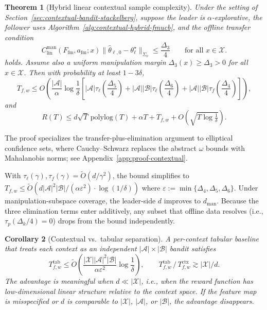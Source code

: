 \documentclass{article}
\newcommand{\cA}{\mathcal{A}}
\newcommand{\cX}{\mathcal{X}}
\newcommand{\cB}{\mathcal{B}}
\newtheorem{theorem}{Theorem}
\newtheorem{corollary}[theorem]{Corollary}
\begin{document}
\begin{theorem}[Hybrid linear contextual sample complexity]
\label{thm:hybrid-contextual-sample-complexity}
Under the setting of Section~\ref{sec:contextual-bandit-stackelberg}, suppose the leader is $\alpha$-explorative, the follower uses Algorithm~\ref{alg:contextual-hybrid-fmucb}, and the offline transfer condition
\[
    C^{\mathrm{man}}_{\mathrm{lin}}(F_{\mathrm{fm}},a_{\mathrm{fm}};x)\|\hat\theta_{\ell,0}-\theta_\ell^\star\|_{\Sigma_\nu}\le \frac{\Delta_3}{4}
    \qquad\text{for all }x\in\cX.
\]
holds. Assume also a uniform manipulation margin $\Delta_3(x)\ge \Delta_3>0$ for all $x\in\cX$. Then with probability at least $1-3\delta$, 
\[
    T_{f,w}\le
    O\!\left(\frac{|\cA|}{\alpha}\log\frac1\delta
    \left[|\cA|\tau_\ell\!\left(\frac{\Delta_5}{4}\right)+|\cA||\cB|\tau_\ell\!\left(\frac{\Delta_6}{4}\right)+|\cA||\cB|\tau_f\!\left(\frac{\Delta_4}{4}\right)\right]\right),
\]
and
\[
    R(T)\le d\sqrt{T}\,\mathrm{polylog}(T)+\alpha T+T_{f,w}+O\!\left(\sqrt{T\log\tfrac{1}{\delta}}\right).
\]
\end{theorem}

The proof specializes the transfer-plus-elimination argument to elliptical confidence sets, where Cauchy--Schwarz replaces the abstract $\omega$ bounds with Mahalanobis norms; see Appendix~\ref{app:proof-contextual}.

With $\tau_\ell(\gamma),\tau_f(\gamma)=\widetilde O(d/\gamma^2)$, the bound simplifies to $T_{f,w}\le \widetilde O(d|\cA|^2|\cB|/(\alpha\varepsilon^2)\cdot\log(1/\delta))$ where $\varepsilon:=\min\{\Delta_4,\Delta_5,\Delta_6\}$. Under manipulation-subspace coverage, the leader-side $d$ improves to $d_{\mathrm{man}}$. Because the three elimination terms enter additively, any subset that offline data resolves (i.e., $\tau_p(\Delta_k/4)=0$) drops from the bound independently.

\begin{corollary}[Contextual vs.\ tabular separation]
\label{cor:contextual-tabular-sep}
A per-context tabular baseline that treats each context as an independent $|\cA|\times|\cB|$ bandit satisfies
\[
    T_{f,w}^{\mathrm{tab}}\le \widetilde O\!\left(\frac{|\cX||\cA|^2|\cB|}{\alpha\varepsilon^2}\log\frac1\delta\right),
    \qquad
    T_{f,w}^{\mathrm{tab}}\,/\,T_{f,w}^{\mathrm{ctx}}\gtrsim |\cX|/d.
\]
The advantage is meaningful when $d\ll|\cX|$, i.e., when the reward function has low-dimensional linear structure relative to the context space. If the feature map is misspecified or $d$ is comparable to $|\cX|$, $|\cA|$, or $|\cB|$, the advantage disappears.
\end{corollary}
\end{document}
